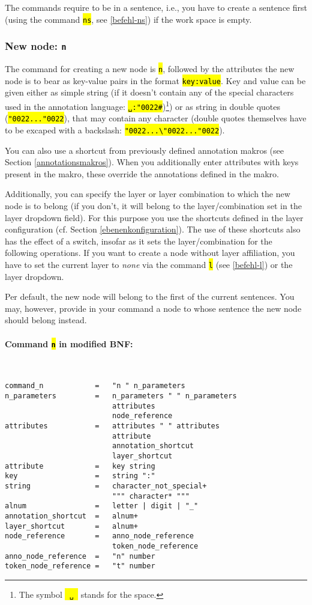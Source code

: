 \documentclass[12pt]{scrartcl}
\newcommand{\quo}{\char"0022}
\newcommand{\code}[1]{\hl{\texttt{#1}}}
\begin{document}
The commands require to be in a sentence, i.e., you have to create a sentence first (using the command \code{ns}, see \ref{befehl-ns}) if the work space is empty.


\subsubsection{New node: \texttt{n}}\label{befehl-n}

The command for creating a new node is \code{n}, followed by the attributes the new node is to bear as key-value pairs in the format \code{key:value}.
Key and value can be given either as simple string (if it doesn’t contain any of the special characters used in the annotation language: \code{␣:\quo\#})\footnote{The symbol \code{\mbox{\,␣\,}} stands for the space.}) or as string in double quotes (\code{\quo...\quo}), that may contain any character (double quotes themselves have to be excaped with a backslash: \code{\quo...\textbackslash\quo...\quo}).

You can also use a shortcut from previously defined annotation makros (see Section \ref{annotationsmakros}).
When you additionally enter attributes with keys present in the makro, these override the annotations defined in the makro.

Additionally, you can specify the layer or layer combination to which the new node is to belong (if you don’t, it will belong to the layer/combination set in the layer dropdown field).
For this purpose you use the shortcuts defined in the layer configuration (cf. Section \ref{ebenenkonfiguration}).
The use of these shortcuts also has the effect of a switch, insofar as it sets the layer/combination for the following operations.
If you want to create a node without layer affiliation, you have to set the current layer to \textit{none} via the command \code{l} (see \ref{befehl-l}) or the layer dropdown.

Per default, the new node will belong to the first of the current sentences.
You may, however, provide in your command a node to whose sentence the new node should belong instead.

\paragraph*{Command \code{n} in modified BNF:}
~
\begin{lstlisting}
command_n            =   "n " n_parameters
n_parameters         =   n_parameters " " n_parameters
                         attributes
                         node_reference
attributes           =   attributes " " attributes
                         attribute
                         annotation_shortcut
                         layer_shortcut
attribute            =   key string
key                  =   string ":"
string               =   character_not_special+
                         """ character* """
alnum                =   letter | digit | "_"
annotation_shortcut  =   alnum+
layer_shortcut       =   alnum+
node_reference       =   anno_node_reference
                         token_node_reference
anno_node_reference  =   "n" number
token_node_reference =   "t" number
\end{lstlisting}
\end{document}
